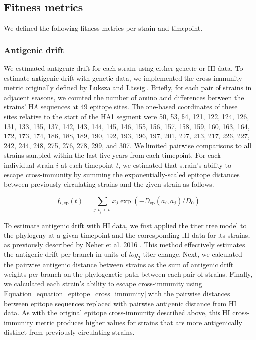 \subsection*{Fitness metrics}

We defined the following fitness metrics per strain and timepoint.

\subsubsection*{Antigenic drift}

We estimated antigenic drift for each strain using either genetic or HI data.
To estimate antigenic drift with genetic data, we implemented the cross-immunity metric originally defined by {\L}uksza and L\"assig \cite{Luksza:2014hj}.
Briefly, for each pair of strains in adjacent seasons, we counted the number of amino acid differences between the strains' HA sequences at 49 epitope sites.
The one-based coordinates of these sites relative to the start of the HA1 segment were 50, 53, 54, 121, 122, 124, 126, 131, 133, 135, 137, 142, 143, 144, 145, 146, 155, 156, 157, 158, 159, 160, 163, 164, 172, 173, 174, 186, 188, 189, 190, 192, 193, 196, 197, 201, 207, 213, 217, 226, 227, 242, 244, 248, 275, 276, 278, 299, and 307.
We limited pairwise comparisons to all strains sampled within the last five years from each timepoint.
For each individual strain $i$ at each timepoint $t$, we estimated that strain's ability to escape cross-immunity by summing the exponentially-scaled epitope distances between previously circulating strains and the given strain as follows.

\begin{equation}
    f_{i,\mathrm{ep}}(t) = \sum_{j: t_{j} < t_{i}}{x_{j}\exp{(-D_{\mathrm{ep}}(a_{i}, a_{j}) / D_{0})}}
    \label{equation_epitope_cross_immunity}
\end{equation}

To estimate antigenic drift with HI data, we first applied the titer tree model to the phylogeny at a given timepoint and the corresponding HI data for its strains, as previously described by Neher et al. 2016 \cite{Neher:2016hy}.
This method effectively estimates the antigenic drift per branch in units of $log_{2}$ titer change.
Next, we calculated the pairwise antigenic distance between strains as the sum of antigenic drift weights per branch on the phylogenetic path between each pair of strains.
Finally, we calculated each strain's ability to escape cross-immunity using Equation~\ref{equation_epitope_cross_immunity} with the pairwise distances between epitope sequences replaced with pairwise antigenic distance from HI data.
As with the original epitope cross-immunity described above, this HI cross-immunity metric produces higher values for strains that are more antigenically distinct from previously circulating strains.


